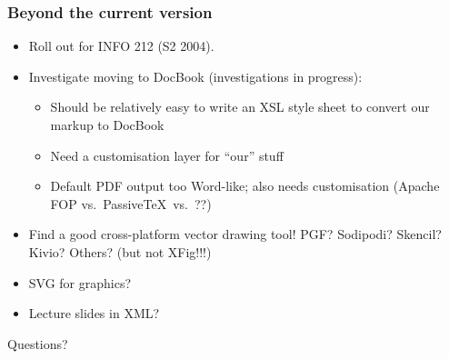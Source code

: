 \documentclass[pdftex,notes=onlyslideswithnotes]{beamer}
\begin{document}
\frame
{
	\frametitle{Beyond the current version}
	
	\begin{itemize}
	
		\item Roll out for INFO 212 (S2 2004).
		
		\item Investigate moving to DocBook (investigations in
		progress):
		
		\begin{itemize}
		
			\item Should be relatively easy to write an XSL style sheet
			to convert our markup to DocBook
			
			\item Need a customisation layer for ``our'' stuff
			
			\item Default PDF output too Word-like; also needs
			customisation (Apache FOP vs.\ Passive\TeX\ vs.\ ??)
			
		\end{itemize}
		
		\item Find a good cross-platform vector drawing tool! PGF?
		Sodipodi? Skencil? Kivio? Others? (but \alert{not} XFig!!!)
		
		\item SVG for graphics?
		
		\item Lecture slides in XML?
		
	
	\end{itemize}
}


\frame
{
	\centering\Huge{\alert{Questions?}}
}
\end{document}
